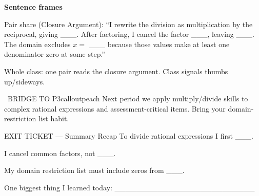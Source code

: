 \documentclass[11pt]{article}
\begin{document}





\begin{sentenceframebox}
\textbf{Sentence frames}

Pair share (Closure Argument): ``I rewrite the division as multiplication by the reciprocal, giving \_\_\_. After factoring, I cancel the factor \_\_\_, leaving \_\_\_. The domain excludes \(x=\) \_\_\_ because those values make at least one denominator zero at some step.''

Whole class: one pair reads the closure argument. Class signals thumbs up/sideways.
\end{sentenceframebox}

\begin{callout}{\IconSearch\ BRIDGE TO P3}{calloutpeach}
Next period we apply multiply/divide skills to complex rational expressions and assessment-critical items. Bring your domain-restriction list habit.
\end{callout}


\begin{summaryexitbox}{EXIT TICKET --- Summary Recap}
To divide rational expressions I first \_\_\_.

I cancel common factors, not \_\_\_.

My domain restriction list must include zeros from \_\_\_.

One biggest thing I learned today: \_\_\_\_\_\_\_\_\_\_\_\_\_\_\_\_\_\_\_\_\_\_\_\_\_\_
\end{summaryexitbox}
\end{document}
